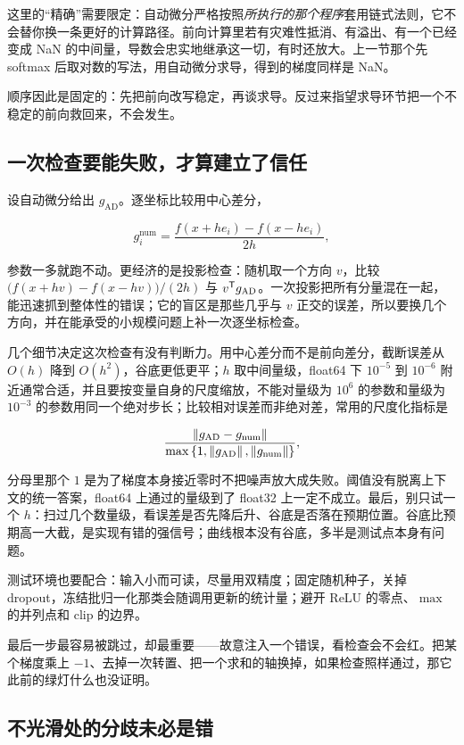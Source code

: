 这里的``精确''需要限定：自动微分严格按照\emph{所执行的那个程序}套用链式法则，它不会替你换一条更好的计算路径。前向计算里若有灾难性抵消、有溢出、有一个已经变成 NaN 的中间量，导数会忠实地继承这一切，有时还放大。上一节那个先 softmax 后取对数的写法，用自动微分求导，得到的梯度同样是 NaN。

顺序因此是固定的：先把前向改写稳定，再谈求导。反过来指望求导环节把一个不稳定的前向救回来，不会发生。

\subsection{一次检查要能失败，才算建立了信任}

设自动微分给出 \(g_{\mathrm{AD}}\)。逐坐标比较用中心差分，

\[
g_i^{\mathrm{num}}=\frac{f(x+he_i)-f(x-he_i)}{2h},
\]

参数一多就跑不动。更经济的是投影检查：随机取一个方向 \(v\)，比较 \(\big(f(x+hv)-f(x-hv)\big)/(2h)\) 与 \(v^{\mathsf{T}}g_{\mathrm{AD}}\)。一次投影把所有分量混在一起，能迅速抓到整体性的错误；它的盲区是那些几乎与 \(v\) 正交的误差，所以要换几个方向，并在能承受的小规模问题上补一次逐坐标检查。

几个细节决定这次检查有没有判断力。用中心差分而不是前向差分，截断误差从 \(O(h)\) 降到 \(O(h^2)\)，谷底更低更平；\(h\) 取中间量级，float64 下 \(10^{-5}\) 到 \(10^{-6}\) 附近通常合适，并且要按变量自身的尺度缩放，不能对量级为 \(10^{6}\) 的参数和量级为 \(10^{-3}\) 的参数用同一个绝对步长；比较相对误差而非绝对差，常用的尺度化指标是

\[
\frac{\left\lVert g_{\mathrm{AD}}-g_{\mathrm{num}}\right\rVert}{\max\left\{1,\left\lVert g_{\mathrm{AD}}\right\rVert,\left\lVert g_{\mathrm{num}}\right\rVert\right\}},
\]

分母里那个 \(1\) 是为了梯度本身接近零时不把噪声放大成失败。阈值没有脱离上下文的统一答案，float64 上通过的量级到了 float32 上一定不成立。最后，别只试一个 \(h\)：扫过几个数量级，看误差是否先降后升、谷底是否落在预期位置。谷底比预期高一大截，是实现有错的强信号；曲线根本没有谷底，多半是测试点本身有问题。

测试环境也要配合：输入小而可读，尽量用双精度；固定随机种子，关掉 dropout，冻结批归一化那类会随调用更新的统计量；避开 ReLU 的零点、\(\max\) 的并列点和 clip 的边界。

最后一步最容易被跳过，却最重要——故意注入一个错误，看检查会不会红。把某个梯度乘上 \(-1\)、去掉一次转置、把一个求和的轴换掉，如果检查照样通过，那它此前的绿灯什么也没证明。

\subsection{不光滑处的分歧未必是错}

